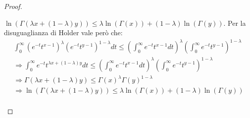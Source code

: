 \begin{proof}
\begin{itemize}
       $\ln(\Gamma(\lambda x+(1-\lambda)y))\le \lambda \ln(\Gamma(x))+(1-\lambda)\ln(\Gamma(y))$.
       Per la disuguaglianza di Holder vale però che:
       \begin{gather*}
       \int_0^{\infty}{(e^{-t}t^{x-1})^\lambda (e^{-t}t^{y-1})^{1-\lambda}dt} \le 
       \left(\int_0^{\infty}{e^{-t}t^{x-1}dt}\right)^\lambda \left(\int_0^{\infty}{e^{-t}t^{y-1}}\right)^{1-\lambda}\\
       \Longrightarrow \int_0^{\infty}{e^{-t}t^{\lambda x +(1-\lambda)y}dt} \le 
       \left(\int_0^{\infty}{e^{-t}t^{x-1}dt}\right)^\lambda \left(\int_0^{\infty}{e^{-t}t^{y-1}}\right)^{1-\lambda}\\
       \Longrightarrow \Gamma(\lambda x+(1-\lambda)y) \le \Gamma(x)^\lambda\Gamma(y)^{1-\lambda}\\
       \Longrightarrow \ln(\Gamma(\lambda x+(1-\lambda)y)) \le \lambda\ln(\Gamma(x))+(1-\lambda)\ln(\Gamma(y))\\
       \end{gather*}
\end{itemize}


\end{proof}
